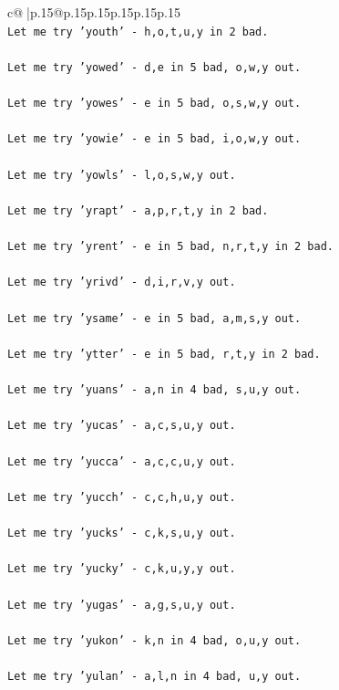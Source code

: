 \documentclass{article}
\begin{document}
{\begin{supertabular}{c@{$\;$}|p{.15\linewidth}@{}p{.15\linewidth}p{.15\linewidth}p{.15\linewidth}p{.15\linewidth}p{.15\linewidth}}
{{{\\ 
\texttt{Let me try 'youth' {-} h,o,t,u,y in 2 bad. } \\
\\ 
\texttt{Let me try 'yowed' {-} d,e in 5 bad, o,w,y out. } \\
\\ 
\texttt{Let me try 'yowes' {-} e in 5 bad, o,s,w,y out. } \\
\\ 
\texttt{Let me try 'yowie' {-} e in 5 bad, i,o,w,y out. } \\
\\ 
\texttt{Let me try 'yowls' {-} l,o,s,w,y out. } \\
\\ 
\texttt{Let me try 'yrapt' {-} a,p,r,t,y in 2 bad. } \\
\\ 
\texttt{Let me try 'yrent' {-} e in 5 bad, n,r,t,y in 2 bad. } \\
\\ 
\texttt{Let me try 'yrivd' {-} d,i,r,v,y out. } \\
\\ 
\texttt{Let me try 'ysame' {-} e in 5 bad, a,m,s,y out. } \\
\\ 
\texttt{Let me try 'ytter' {-} e in 5 bad, r,t,y in 2 bad. } \\
\\ 
\texttt{Let me try 'yuans' {-} a,n in 4 bad, s,u,y out. } \\
\\ 
\texttt{Let me try 'yucas' {-} a,c,s,u,y out. } \\
\\ 
\texttt{Let me try 'yucca' {-} a,c,c,u,y out. } \\
\\ 
\texttt{Let me try 'yucch' {-} c,c,h,u,y out. } \\
\\ 
\texttt{Let me try 'yucks' {-} c,k,s,u,y out. } \\
\\ 
\texttt{Let me try 'yucky' {-} c,k,u,y,y out. } \\
\\ 
\texttt{Let me try 'yugas' {-} a,g,s,u,y out. } \\
\\ 
\texttt{Let me try 'yukon' {-} k,n in 4 bad, o,u,y out. } \\
\\ 
\texttt{Let me try 'yulan' {-} a,l,n in 4 bad, u,y out. } \\
}}}
\end{supertabular}}
\end{document}
